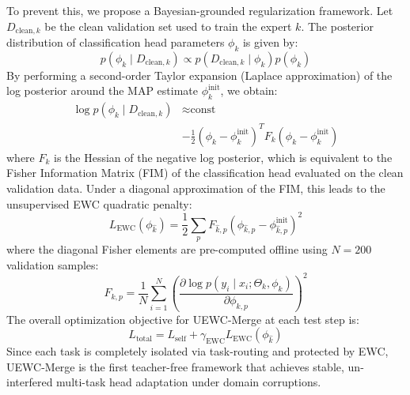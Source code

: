 \documentclass{article}
\theoremstyle{plain}
\theoremstyle{definition}
\theoremstyle{remark}
\begin{document}
To prevent this, we propose a Bayesian-grounded regularization framework. Let $D_{\text{clean}, k}$ be the clean validation set used to train the expert $k$. The posterior distribution of classification head parameters $\phi_k$ is given by:
\begin{equation}
    p(\phi_k \mid D_{\text{clean}, k}) \propto p(D_{\text{clean}, k} \mid \phi_k) p(\phi_k)
\end{equation}
By performing a second-order Taylor expansion (Laplace approximation) of the log posterior around the MAP estimate $\phi_k^{\text{init}}$, we obtain:
\begin{equation}
\begin{split}
    \log p(\phi_k \mid D_{\text{clean}, k}) & \approx \text{const} \\
    & - \frac{1}{2} (\phi_k - \phi_k^{\text{init}})^T F_k (\phi_k - \phi_k^{\text{init}})
\end{split}
\end{equation}
where $F_k$ is the Hessian of the negative log posterior, which is equivalent to the Fisher Information Matrix (FIM) of the classification head evaluated on the clean validation data. Under a diagonal approximation of the FIM, this leads to the unsupervised EWC quadratic penalty:
\begin{equation}
    L_{\text{EWC}}(\phi_{\hat{k}}) = \frac{1}{2} \sum_{p} F_{\hat{k},p} (\phi_{\hat{k},p} - \phi_{\hat{k},p}^{\text{init}})^2
\end{equation}
where the diagonal Fisher elements are pre-computed offline using $N=200$ validation samples:
\begin{equation}
    F_{k,p} = \frac{1}{N} \sum_{i=1}^N \left( \frac{\partial \log p(y_i \mid x_i; \Theta_k, \phi_k)}{\partial \phi_{k,p}} \right)^2
\end{equation}
The overall optimization objective for UEWC-Merge at each test step is:
\begin{equation}
    L_{\text{total}} = L_{\text{self}} + \gamma_{\text{EWC}} L_{\text{EWC}}(\phi_{\hat{k}})
\end{equation}
Since each task is completely isolated via task-routing and protected by EWC, UEWC-Merge is the first teacher-free framework that achieves stable, un-interfered multi-task head adaptation under domain corruptions.
\end{document}
